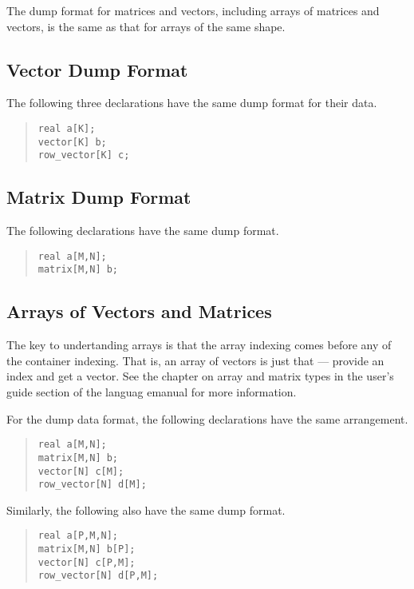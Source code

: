 The dump format for matrices and vectors, including arrays of matrices
and vectors, is the same as that for arrays of the same shape.

\subsection{Vector Dump Format}

The following three declarations have the same dump format for their
data.
%
\begin{quote}
\begin{Verbatim}
real a[K];
vector[K] b;
row_vector[K] c;
\end{Verbatim}
\end{quote}

\subsection{Matrix Dump Format}

The following declarations have the same dump format.
%
\begin{quote}
\begin{Verbatim}
real a[M,N];
matrix[M,N] b;
\end{Verbatim}
\end{quote}

\subsection{Arrays of Vectors and Matrices}

The key to undertanding arrays is that the array indexing comes before
any of the container indexing.  That is, an array of vectors is just
that --- provide an index and get a vector.  See the chapter on array and matrix types in the user's guide section of the languag emanual for more information.

For the dump data format, the following declarations have the same
arrangement.
%
\begin{quote}
\begin{Verbatim}
real a[M,N];
matrix[M,N] b;
vector[N] c[M];
row_vector[N] d[M];
\end{Verbatim}
\end{quote}
%
Similarly, the following also have the same dump format.
%
\begin{quote}
\begin{Verbatim}
real a[P,M,N];
matrix[M,N] b[P];
vector[N] c[P,M];
row_vector[N] d[P,M];
\end{Verbatim}
\end{quote}

